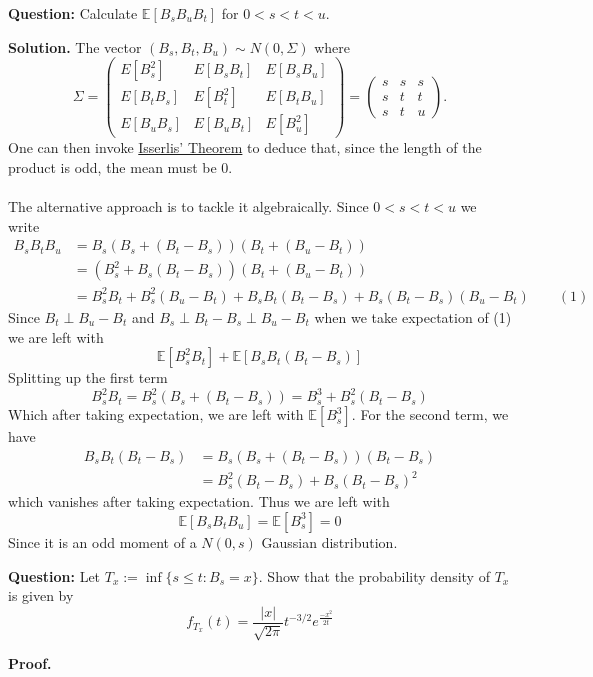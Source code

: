 \documentclass{article}
\begin{document}
\begin{tcolorbox}[colframe=black,colback=gray!5,boxrule=0.5pt]
\textbf{Question:} Calculate $\mathbb{E}[B_sB_uB_t]$ for $0<s<t<u.$
\end{tcolorbox}
\textbf{Solution.} The vector $(B_s, B_t, B_u)\sim N(0,\Sigma)$ where 
\[
\Sigma = \begin{pmatrix}
E[B_s^2] & E[B_s B_t] & E[B_s B_u] \\
E[B_t B_s] & E[B_t^2] & E[B_t B_u] \\
E[B_u B_s] & E[B_u B_t] & E[B_u^2]
\end{pmatrix}
= 
\begin{pmatrix}
s & s & s \\
s & t & t \\
s & t & u
\end{pmatrix}.
\]
One can then invoke \href{https://en.wikipedia.org/wiki/Isserlis%27s_theorem}{Isserlis' Theorem} to deduce that, since the length of the product is odd, the mean must be 0. \\
\\
The alternative approach is to tackle it algebraically. Since $0<s<t<u$ we write
\begin{align*}
    B_sB_tB_u &= B_s(B_s+(B_t-B_s))(B_t+(B_u-B_t)) \\
    &= (B_s^2 + B_s(B_t-B_s))(B_t+(B_u-B_t)) \\
    &= B_s^2B_t + B_s^2(B_u-B_t)+B_sB_t(B_t-B_s) + B_s(B_t-B_s)(B_u-B_t) \quad\quad (1)
\end{align*}
Since $B_t\perp B_u-B_t$ and $B_s \perp B_t-B_s \perp B_u-B_t$ when we take expectation of (1) we are left with
$$\mathbb{E}[B_s^2B_t] + \mathbb{E}[B_s B_t(B_t-B_s)]$$
Splitting up the first term
$$B_s^2B_t = B_s^2 (B_s + (B_t-B_s)) = B_s^3 + B_s^2(B_t-B_s)$$
Which after taking expectation, we are left with $\mathbb{E}[B_s^3].$ For the second term, we have 
\begin{align*}
    B_sB_t(B_t-B_s)&=B_s(B_s+(B_t-B_s))(B_t-B_s) \\
    &=B_s^2(B_t-B_s)+B_s(B_t-B_s)^2
\end{align*}
which vanishes after taking expectation. Thus we are left with 
$$\mathbb{E}[B_sB_tB_u] = \mathbb{E}[B_s^3]=0$$
Since it is an odd moment of a $N(0,s)$ Gaussian distribution.


\begin{tcolorbox}[colframe=black,colback=gray!5,boxrule=0.5pt]
    \textbf{Question:} Let $T_x :=\inf\{s\leq t: B_s=x\}$. Show that the probability density of $T_x$ is given by
    $$f_{T_x}(t) = \frac{|x|}{\sqrt{2\pi}} t^{-3/2} e^{\frac{-x^2}{2t}}$$
\end{tcolorbox}
\textbf{Proof.}
\end{document}

